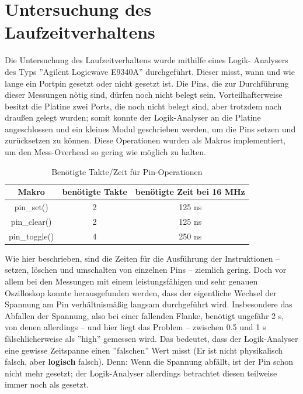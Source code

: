 \chapter{Untersuchung des Laufzeitverhaltens}
Die Untersuchung des Laufzeitverhaltens wurde mithilfe eines Logik-
Analysers des Typs ''Agilent Logicwave E9340A'' durchgeführt. Dieser misst, wann und wie lange
ein Portpin gesetzt oder nicht gesetzt ist. Die Pins, die zur Durchführung
dieser Messungen nötig sind, dürfen noch nicht belegt sein. Vorteilhafterweise
besitzt die Platine zwei Ports, die noch nicht belegt sind, aber
trotzdem nach draußen gelegt wurden; somit konnte der Logik-Analyser
an die Platine angeschlossen und ein kleines Modul
geschrieben werden, um die Pins setzen und zurücksetzen zu
können. Diese Operationen wurden als Makros implementiert, um den
Mess-Overhead so gering wie möglich zu halten.
\begin{table}[htb]
\begin{center}
	\begin{tabular}{|c||c|c|}
		\hline
		\textbf{Makro} & \textbf{benötigte Takte} & \textbf{benötigte Zeit bei 16 MHz} \\ \hline \hline
		pin\_set() & 2 & 125 ns \\ \hline
		pin\_clear() & 2 & 125 ns \\ \hline
		pin\_toggle() & 4 & 250 ns \\ \hline
	\end{tabular}
	\caption{\label{pin_takte} Benötigte Takte/Zeit für Pin-Operationen}
\end{center}
\end{table}
Wie hier beschrieben, sind die Zeiten für die Ausführung der Instruktionen
-- setzen, löschen und umschalten von einzelnen Pins -- ziemlich gering.
Doch vor allem bei den Messungen mit einem leistungsfähigen und
sehr genauen Oszilloskop konnte herausgefunden werden, dass der eigentliche
Wechsel der Spannung am Pin verhältnismäßig langsam durchgeführt wird.
Insbesondere das Abfallen der Spannung, also bei einer fallenden Flanke,
benötigt ungefähr 2 \textmu{}s, von denen allerdings -- und hier liegt das Problem -- zwischen
0.5 und 1 \textmu{}s fälschlicherweise als ''high'' gemessen wird.
Das bedeutet, dass der Logik-Analyser eine gewisse Zeitspanne einen ''falschen''
Wert misst (Er ist nicht physikalisch falsch, aber \textbf{logisch} falsch).
Denn: Wenn die Spannung abfällt, ist der Pin schon nicht mehr gesetzt; der
Logik-Analyser allerdings betrachtet diesen teilweise immer noch als gesetzt.
